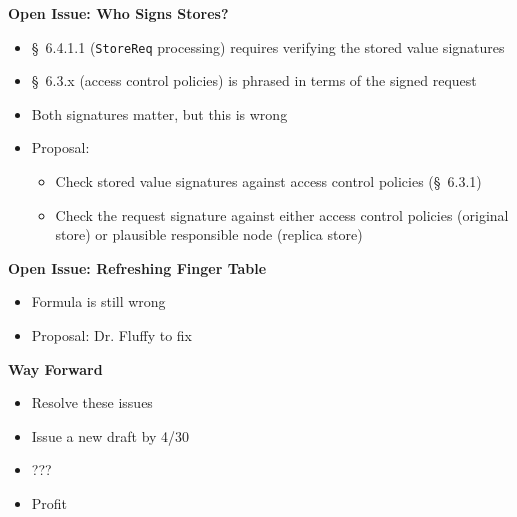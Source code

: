 \documentclass[helvetica]{seminar}
\newcommand{\heading}[1]{%
  \begin{center} 
    \large\bf 
    #1 
  \end{center} 
  \vspace{.4 in}}
\begin{document}
\begin{slide}
\heading{Open Issue: Who Signs Stores?}

\begin{itemize}
\item \S\ 6.4.1.1 (\verb^StoreReq^ processing) requires verifying the stored value signatures
\item \S\ 6.3.x (access control policies) is phrased in terms of the signed request

\item Both signatures matter, but this is wrong
\item Proposal:
  \begin{itemize}
  \item Check stored value signatures against access control policies (\S\ 6.3.1)
  \item Check the request signature against either access control policies (original store) or plausible responsible node (replica store)
  \end{itemize}
\end{itemize}
\end{slide}



\begin{slide}
\heading{Open Issue: Refreshing Finger Table}

\begin{itemize}
\item Formula is still wrong
\item Proposal: Dr. Fluffy to fix
\end{itemize}



\end{slide}


\begin{slide}
\heading{Way Forward}

\begin{itemize}

\item Resolve these issues
\item Issue a new draft by 4/30
\item ???
\item Profit
\end{itemize}

\end{slide}
\end{document}
